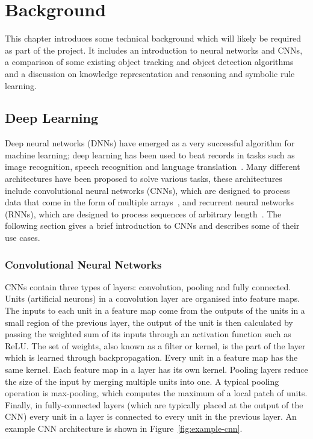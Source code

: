 \documentclass[../interim.tex]{subfiles}
\begin{document}
\chapter{Background}

This chapter introduces some technical background which will likely be required as part of the project. It includes an introduction to neural networks and CNNs, a comparison of some existing object tracking and object detection algorithms and a discussion on knowledge representation and reasoning and symbolic rule learning.

\section{Deep Learning}

Deep neural networks (DNNs) have emerged as a very successful algorithm for machine learning; deep learning has been used to beat records in tasks such as image recognition, speech recognition and language translation~\cite{deep-learning-intro}. Many different architectures have been proposed to solve various tasks, these architectures include convolutional neural networks (CNNs), which are designed to process data that come in the form of multiple arrays~\cite{deep-learning-intro}, and recurrent neural networks (RNNs), which are designed to process sequences of arbitrary length~\cite{def:rnn}. The following section gives a brief introduction to CNNs and describes some of their use cases.

\subsection{Convolutional Neural Networks}

CNNs contain three types of layers: convolution, pooling and fully connected. Units (artificial neurons) in a convolution layer are organised into feature maps. The inputs to each unit in a feature map come from the outputs of the units in a small region of the previous layer, the output of the unit is then calculated by passing the weighted sum of its inputs through an activation function such as ReLU. The set of weights, also known as a filter or kernel, is the part of the layer which is learned through backpropagation. Every unit in a feature map has the same kernel. Each feature map in a layer has its own kernel. Pooling layers reduce the size of the input by merging multiple units into one. A typical pooling operation is max-pooling, which computes the maximum of a local patch of units. Finally, in fully-connected layers (which are typically placed at the output of the CNN) every unit in a layer is connected to every unit in the previous layer. An example CNN architecture is shown in Figure~\ref{fig:example-cnn}.
\end{document}
